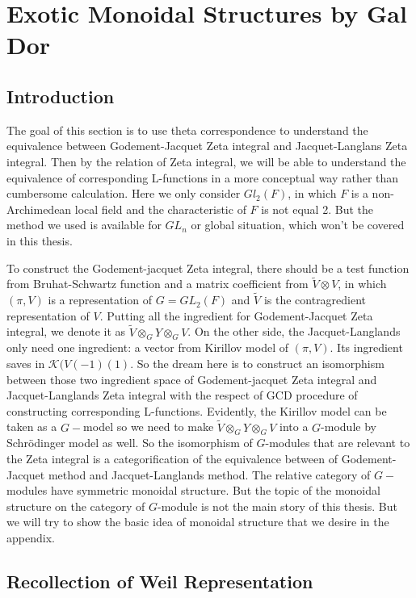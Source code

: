 \documentclass[12pt,a4paper,english]{article}
\theoremstyle{plain}
\theoremstyle{definition}
\begin{document}
\section{Exotic Monoidal Structures by Gal Dor}
\subsection{Introduction}
The goal of this section is to use theta correspondence to understand the equivalence between Godement-Jacquet Zeta integral and Jacquet-Langlans Zeta integral. Then by the relation of Zeta integral, we will be able to understand the equivalence of corresponding L-functions in a more conceptual way rather than cumbersome calculation. Here we only consider $Gl_{2}(F)$, in which $F$ is a non-Archimedean local field and the characteristic of $F$ is not equal 2. But the method we used is available for $GL_{n}$ or global situation, which won't be covered in this thesis.

To construct the Godement-jacquet Zeta integral, there should be a test function from Bruhat-Schwartz function and a matrix coefficient from $\tilde{V}\otimes V$, in which $(\pi, V)$ is a representation of $G=GL_{2}(F)$ and $\tilde{V}$ is the contragredient representation of $V$. Putting all the ingredient for Godement-Jacquet Zeta integral, we denote it as $\tilde{V}\otimes_{G}Y\otimes_{G}V$. On the other side, the Jacquet-Langlands only need one ingredient: a vector from Kirillov model of $(\pi, V)$. Its ingredient saves in $\mathcal{K}(V(-1)(1)$. So the dream here is to construct an isomorphism between those two ingredient space of Godement-jacquet Zeta integral and Jacquet-Langlands Zeta integral with the respect of GCD procedure of constructing corresponding L-functions. Evidently, the Kirillov model can be taken as a $G-$model so we need to make $\tilde{V}\otimes_{G}Y\otimes_{G} V$ into a $G$-module by Schr\"{o}dinger model as well. So the isomorphism of $G$-modules that are relevant to the Zeta integral is a categorification of the  equivalence between of Godement-Jacquet method and Jacquet-Langlands method. The relative category of $G-$modules have symmetric monoidal structure. But the topic of the monoidal structure on the category of $G$-module is not the main story of this thesis. But we will try to show the basic idea of monoidal structure that we desire in the appendix.
\subsection{Recollection of Weil Representation}
\end{document}
